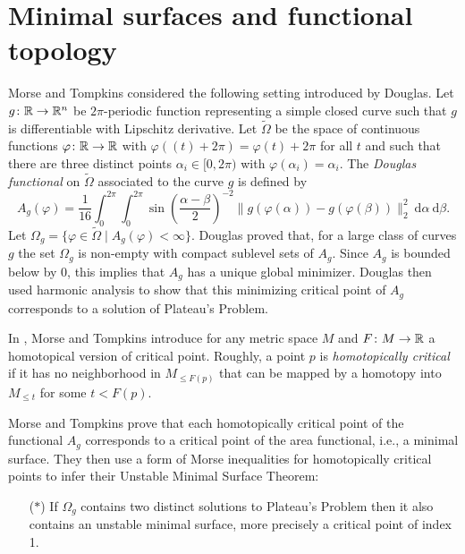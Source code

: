 
\section{Minimal surfaces and functional topology} \label{s:surfaces}

Morse and Tompkins considered the following setting introduced by Douglas.
Let $g \colon \mathbb{R} \to \mathbb{R}^n$ be $2\pi$-periodic function representing a simple closed curve such that $g$ is differentiable with Lipschitz derivative.
Let $\widetilde{\Omega}$ be the space of continuous functions $\varphi \colon \mathbb{R} \to \mathbb{R}$ with $\varphi((t)+2\pi) = \varphi(t) + 2\pi$ for all $t$ and such that there are three distinct points $\alpha_i \in [0,2\pi)$ with $\varphi(\alpha_i)=\alpha_i$.
The \emph{Douglas functional} on $\widetilde \Omega$ associated to the curve $g$ is defined by
\begin{equation*}
A_g(\varphi)=\frac{1}{16}\int_0^{2\pi}\int_0^{2\pi}\sin\left(\frac{\alpha-\beta}{2}\right)^{-2} \! \lVert g(\varphi(\alpha))-g(\varphi(\beta)) \rVert_2^2 \ \mathrm{d}\alpha \ \mathrm{d}\beta.
\end{equation*}
Let $\Omega_g=\{\varphi\in\widetilde\Omega\mid A_g(\varphi)<\infty\}$.
Douglas proved that, for a large class of curves $g$ the set $\Omega_g$ is non-empty with compact sublevel sets of $A_g$.
Since $A_g$ is bounded below by $0$, this implies that $A_g$ has a unique global minimizer.
Douglas then used harmonic analysis to show that this minimizing critical point of $A_g$ corresponds to a solution of Plateau's Problem.

In \cite[p.445]{Morse.1939}, Morse and Tompkins introduce for any metric space $M$ and $F \colon M \to \mathbb{R}$ a homotopical version of critical point.
Roughly, a point $p$ is \textit{homotopically critical} if it has no neighborhood in $M_{\leq F(p)}$ that can be mapped by a homotopy into $M_{\leq t}$ for some $t<F(p)$.

Morse and Tompkins prove that each homotopically critical point of the functional $A_g$ corresponds to a critical point of the area functional, i.e., a minimal surface.
They then use a form of Morse inequalities for homotopically critical points to infer their Unstable Minimal Surface Theorem:
\begin{itemize}
    \item[($\ast$)] If $\Omega_g$ contains two distinct solutions to Plateau's Problem then it also contains an unstable minimal surface, more precisely a critical point of index 1.
\end{itemize}

